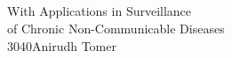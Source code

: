 \documentclass[12pt]{article}
\title{\HUGE{\textbf{Personalized Schedules for\\Invasive Diagnostic Tests}}\\
\vspace{-20mm}}
\date{}
\makeatletter
\newcommand\HUGE{\@setfontsize\Huge{30}{40}}
\makeatother
\begin{document}
\maketitle
\vspace{-17mm}
\begin{flushright}
\Large{With Applications in Surveillance\\ of Chronic Non-Communicable Diseases}\\
\vspace{115mm}
\HUGE Anirudh Tomer
\end{flushright}
\end{document}
